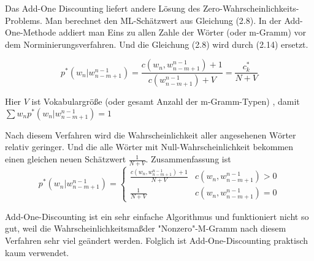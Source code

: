 Das Add-One Discounting liefert andere L\"osung des Zero-Wahrscheinlichkeits-Problems. Man berechnet den ML-Sch\"atzwert aus Gleichung (2.8). In der Add-One-Methode addiert man Eins zu allen Zahle der W\"orter (oder m-Gramm) vor dem Norminierungsverfahren.  Und die Gleichung (2.8) wird durch (2.14) ersetzt.

\begin{equation}
\label{equation:add_one_01}
p^{*}(w_{n}|w_{n-m+1}^{n-1})=\frac{c(w_{n},w_{n-m+1}^{n-1})+1}{c(w_{n-m+1}^{n-1})+V}=\frac{c_{k}^{*}}{N+V}
\end{equation}

Hier $V$ ist Vokabulargr\"o\ss e (oder gesamt Anzahl der m-Gramm-Typen) , damit \\ 
$\sum{w_{n}}p^{*}(w_{n}|w_{n-m+1}^{n-1})=1$

Nach diesem Verfahren wird die Wahrscheinlichkeit aller angesehenen W\"orter relativ geringer. Und die alle W\"orter mit Null-Wahrscheinlichkeit bekommen einen gleichen neuen Sch\"atzwert $\frac{1}{N+V}$. Zusammenfassung ist
\begin{equation}
p^{*}(w_{n}|w_{n-m+1}^{n-1})=\begin{cases}
\frac{c(w_{n},w_{n-m+1}^{n-1})+1}{N+V} & c(w_{n},w_{n-m+1}^{n-1})>0 \\
\frac{1}{N+V} & c(w_{n},w_{n-m+1}^{n-1})=0 
\end{cases}
\end{equation}

Add-One-Discounting ist ein sehr einfache Algorithmus und funktioniert nicht so gut, weil die Wahrscheinlichkeitsma\ss der "Nonzero"-M-Gramm nach diesem Verfahren sehr viel ge\"andert werden\cite{book_speech}. Folglich ist Add-One-Discounting  praktisch kaum verwendet.
